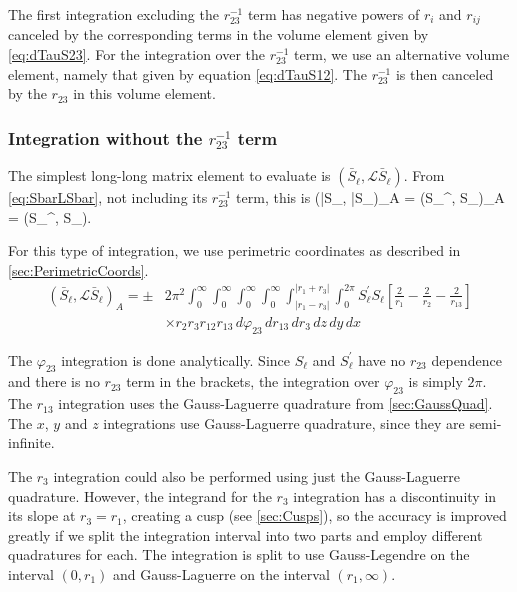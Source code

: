 \documentclass[Dissertation.tex]{subfiles}
\begin{document}
The first integration excluding the $r_{23}^{-1}$ term has negative powers of 
$r_i$ and $r_{ij}$ canceled by the corresponding terms in the volume element 
given by \cref{eq:dTauS23}. For the integration over the $r_{23}^{-1}$ term, 
we use an alternative volume element, namely that given by equation
\cref{eq:dTauS12}.
The $r_{23}^{-1}$ is then canceled by the $r_{23}$ in this volume element.


\subsubsection{Integration without the \texorpdfstring{$r_{23}^{-1}$} {1/r23} term}
\label{sec:LongLongNoR23}
The simplest long-long matrix element to evaluate is
$(\bar{S}_\ell,\mathcal{L} \bar{S}_\ell)$. From \cref{eq:SbarLSbar}, not
including its $r_{23}^{-1}$ term, this is
\beq
(\bar{S}_\ell, \bar{S}_\ell)_A = \pm \left(S_\ell^\prime, S_\ell\right)_A = \pm \left(S_\ell^\prime,  S_\ell\right).
\eeq

For this type of integration, we use perimetric coordinates as described in
\cref{sec:PerimetricCoords}.
\begin{align}
\label{eq:SBarSBarInt}
(\bar{S}_\ell,\mathcal{L} \bar{S}_\ell)_A = \pm &2\pi^2 \int_0^\infty \int_0^\infty \int_0^\infty \int_0^\infty \int_{|r_1 - r_3|}^{|r_1 + r_3|} \int_0^{2\pi}  S_\ell^\prime S_\ell \left[ \frac{2}{r_1} - \frac{2}{r_2} - \frac{2}{r_{13}}\right] \\
&\times r_2 r_3 r_{12} r_{13}\, d\varphi_{23}\, dr_{13}\, dr_3\, dz\, dy\, dx
\end{align}

The $\varphi_{23}$ integration is done analytically. Since $S_\ell$ and
$S_\ell^\prime$ have no $r_{23}$ dependence and there is no $r_{23}$ term in
the brackets, the integration over $\varphi_{23}$ is simply $2\pi$. The
$r_{13}$ integration uses the Gauss-Laguerre quadrature from
\cref{sec:GaussQuad}. The $x$, $y$ and $z$ integrations use Gauss-Laguerre 
quadrature, since they are semi-infinite.

The $r_3$ integration could also be performed using just the Gauss-Laguerre 
quadrature. However, the integrand for the $r_3$ integration has a 
discontinuity in its slope at $r_3=r_1$, creating a cusp
(see \cref{sec:Cusps}), so the accuracy is improved greatly if we split the
integration interval into two parts and employ different quadratures for each.
The integration is split to use Gauss-Legendre on the interval $(0,r_1)$ and
Gauss-Laguerre on the interval $(r_1,\infty)$.
\end{document}
